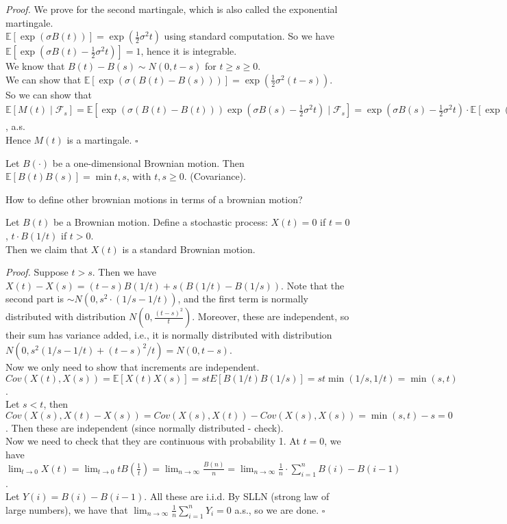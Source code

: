 \documentclass[a4paper]{article}
\newenvironment{proof}{\begin{breakbox}\textit{Proof.}}{\hfill$\square$\end{breakbox}}
\newcommand{\nl}{\vspace{0.2cm}\\}
\newcommand{\F}{\mathcal{F}}
\newcommand{\E}{\mathbb{E}}
\begin{document}
\begin{proof}
    We prove for the second martingale, which is also called the exponential martingale.\nl
    $\E[\exp(\sigma B(t))] = \exp(\frac{1}{2}\sigma^2 t)$ using standard computation. So we have $\E[\exp(\sigma B(t) - \frac{1}{2}\sigma^2 t)] = 1$, hence it is integrable.\nl
    We know that $B(t) - B(s) \sim N(0, t - s)$ for $t \ge s \ge 0$.\nl
    We can show that
    $\E[\exp(\sigma (B(t) - B(s)))] = \exp(\frac{1}{2}\sigma^2(t-s))$.\nl
    So we can show that $\E[M(t) \mid \F_s] = \E[\exp(\sigma(B(t) - B(t)))\exp(\sigma B(s) - \frac{1}{2}\sigma^2 t) \mid \F_s] = \exp(\sigma B(s) - \frac{1}{2}\sigma^2 t) \cdot
    \E[\exp(\sigma(B(t) - B(s))) \mid \F_s] = \exp(\sigma B(s) - \frac{1}{2} \sigma^2 t) \cdot \E[\exp(\sigma(B(t) - B(s)))] = \exp(\sigma B(s) - \frac{1}{2} \sigma^2 t) \cdot \exp(\frac{1}{2}
    \sigma^2 (t - s)^2) = M(s)$, a.s.\nl
    Hence $M(t)$ is a martingale.
\end{proof}

\begin{lemma}
    Let $B(\cdot)$ be a one-dimensional Brownian motion. Then $\E[B(t) B(s)] = \min{t, s}$, with $t, s \ge 0$. (Covariance).
\end{lemma}
How to define other brownian motions in terms of a brownian motion?\nl

\begin{eg}
    Let $B(t)$ be a Brownian motion. Define a stochastic process:
    $X(t) = 0$ if $t = 0$, $t \cdot B(1/t)$ if $t > 0$.\nl
    Then we claim that $X(t)$ is a standard Brownian motion.
\end{eg}
\begin{proof}
    Suppose $t > s$. Then we have $X(t) - X(s) = (t - s)B(1/t) + s(B(1/t) - B(1/s))$. Note that the second part is $\sim N(0, s^2 \cdot \left(1/s - 1/t\right))$, and the first term is normally
    distributed with distribution $N(0, \frac{(t - s)^2}{t})$. Moreover, these are independent, so their sum has variance added, i.e., it is normally distributed with distribution $N(0, s^2(1/s - 1/t)
    + (t-s)^2/t) = N(0, t - s)$.\nl
    Now we only need to show that increments are independent.\nl
    $Cov(X(t), X(s)) = \E[X(t)X(s)] = stE[B(1/t)B(1/s)] = st \min(1/s, 1/t) = \min(s, t)$.\nl
    Let $s < t$, then $Cov(X(s), X(t) - X(s)) = Cov(X(s), X(t)) - Cov(X(s), X(s)) = \min(s, t) - s = 0$. Then these are independent (since normally distributed - check).\nl
    Now we need to check that they are continuous with probability 1. At $t = 0$, we have $\lim_{t \to 0} X(t) = \lim_{t \to 0} t B(\frac{1}{t}) = \lim_{n \to \infty} \frac{B(n)}{n} = \lim_{n
    \to \infty} \frac{1}{n} \cdot \sum_{i=1}^n B(i) - B(i - 1)$.\nl Let $Y(i) = B(i) - B(i - 1)$. All these are i.i.d.
    By SLLN (strong law of large numbers), we have that $\lim_{n \to \infty} \frac{1}{n} \sum_{i = 1}^n Y_i = 0$ a.s., so we are done.
\end{proof}
\end{document}
